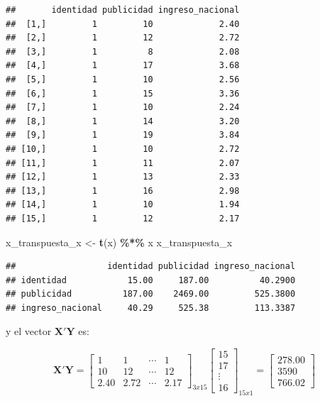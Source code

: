 \documentclass[
]{book}
\newenvironment{Shaded}{\begin{snugshade}}{\end{snugshade}}
\newcommand{\FunctionTok}[1]{\textcolor[rgb]{0.13,0.29,0.53}{\textbf{#1}}}
\newcommand{\NormalTok}[1]{#1}
\newcommand{\OtherTok}[1]{\textcolor[rgb]{0.56,0.35,0.01}{#1}}
\newcommand{\SpecialCharTok}[1]{\textcolor[rgb]{0.81,0.36,0.00}{\textbf{#1}}}
\begin{document}
\begin{verbatim}
##       identidad publicidad ingreso_nacional
##  [1,]         1         10             2.40
##  [2,]         1         12             2.72
##  [3,]         1          8             2.08
##  [4,]         1         17             3.68
##  [5,]         1         10             2.56
##  [6,]         1         15             3.36
##  [7,]         1         10             2.24
##  [8,]         1         14             3.20
##  [9,]         1         19             3.84
## [10,]         1         10             2.72
## [11,]         1         11             2.07
## [12,]         1         13             2.33
## [13,]         1         16             2.98
## [14,]         1         10             1.94
## [15,]         1         12             2.17
\end{verbatim}

\begin{Shaded}
\begin{Highlighting}[]
\NormalTok{x\_transpuesta\_x }\OtherTok{\textless{}{-}} \FunctionTok{t}\NormalTok{(x) }\SpecialCharTok{\%*\%}\NormalTok{ x}
\NormalTok{x\_transpuesta\_x}
\end{Highlighting}
\end{Shaded}

\begin{verbatim}
##                  identidad publicidad ingreso_nacional
## identidad            15.00     187.00          40.2900
## publicidad          187.00    2469.00         525.3800
## ingreso_nacional     40.29     525.38         113.3387
\end{verbatim}

y el vector \(\boldsymbol{X'Y}\) es:

\[
\begin{equation}
\boldsymbol{X'Y}=\begin{bmatrix}
 1&  1&  \cdots& 1\\ 
 10&  12&  \cdots& 12\\ 
 2.40&  2.72&  \cdots&  2.17
\end{bmatrix}_{3x15}
\begin{bmatrix}
15\\ 
17\\ 
\vdots \\ 
16
\end{bmatrix}_{15x1} = \begin{bmatrix}
278.00\\ 
3590\\ 
766.02
\end{bmatrix}
\end{equation}
\]
\end{document}

